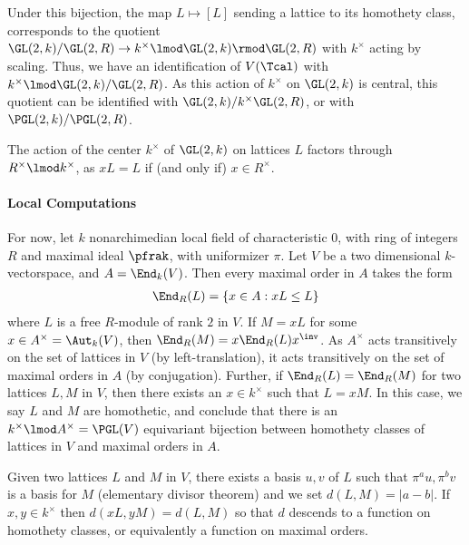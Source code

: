 \documentclass[draft]{article}
\begin{document}
Under this bijection, the map $L\mapsto [L]$ sending a lattice to its homothety class, corresponds to the quotient $\GL(2,k) / \GL(2,R) \to k^\times \lmod \GL(2,k) \rmod \GL(2,R)$ with $k^\times$ acting by scaling. Thus, we have an identification of $V(\Tcal)$ with $k^\times \lmod \GL(2,k)/\GL(2,R)$. As this action of $k^\times$ on $\GL(2,k)$ is central, this quotient can be identified with $\GL(2,k)/k^\times\GL(2,R)$, or with $\PGL(2,k)/\PGL(2,R)$. 



\begin{remark}
    \begin{enumerate*}
        \item The action of the center $k^\times$ of $\GL(2,k)$ on lattices $L$ factors through $R^\times \lmod k^\times $, as $xL = L$  if (and only if) $x \in R^\times$. 
    \end{enumerate*}
\end{remark}
 


\paragraph*{Local Computations} 
For now, let $k$ nonarchimedian local field of characteristic $0$, with ring of integers $R$ and maximal ideal $\pfrak$, with uniformizer $\pi$. Let $V$ be a two dimensional $k$-vectorspace, and $A = \End_k(V)$. Then every maximal order in $A$ takes the form 
\begin{align*}
    \End_R(L) = \{ x \in A : xL\leq L\}
\end{align*}
where $L$ is a free $R$-module of rank $2$ in $V$. If $M = xL$ for some $x\in A^\times = \Aut_k(V)$, then $\End_R(M) = x\End_R(L)x^\inv$. As $A^\times$ acts transitively on the set of lattices in $V$ (by left-translation), it acts transitively on the set of maximal orders in $A$ (by conjugation). Further, if $\End_R(L)=\End_R(M)$ for two lattices $L,M$ in $V$, then there exists an $x \in k^\times$ such that $L = x M$. In this case, we say $L$ and $M$ are homothetic, and conclude that there is an $k^\times \lmod A^\times = \PGL(V)$ equivariant bijection between homothety classes of lattices in $V$ and maximal orders in $A$. 

Given two lattices $L$ and $M$ in $V$, there exists a basis $u,v$ of $L$ such that $\pi^a u , \pi^b v$ is a basis for $M$ (elementary divisor theorem) and we set $d(L,M) = |a-b|$. If $x,y\in k^\times$ then $d(xL,yM)=d(L,M)$ so that $d$ descends to a function on homothety classes, or equivalently a function on maximal orders. 


\cite{sallyFourierTransformOrbital1983}


\end{document}
